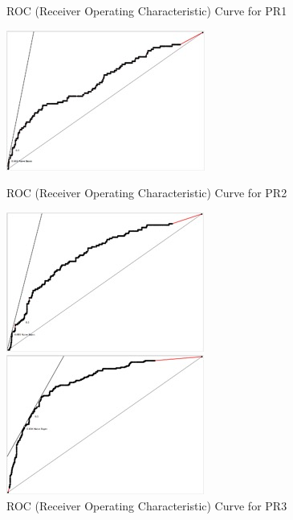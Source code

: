 \begin{figure}[!p]
\begin{minipage}[b]{0.5\linewidth}
		\caption{ROC (Receiver Operating Characteristic) Curve for PR1} 
	\end{minipage}
	\hfill
	\begin{minipage}[b]{0.5\linewidth}
		\centering
		\includegraphics[width=.9\linewidth]{figures/thoeming_Fig7} 
		\caption{ROC (Receiver Operating Characteristic) Curve for PR2} 
	\end{minipage}
	\begin{minipage}[b]{0.5\linewidth}
		\centering
		\includegraphics[width=.9\linewidth]{figures/thoeming_Fig8} 
		\caption{ROC (Receiver Operating Characteristic) Curve for PR3} 
	\end{minipage} 
	\begin{minipage}[b]{0.5\linewidth}
		\centering
		\includegraphics[width=.9\linewidth]{figures/thoeming_Fig9} 

\end{minipage}
\end{figure}
